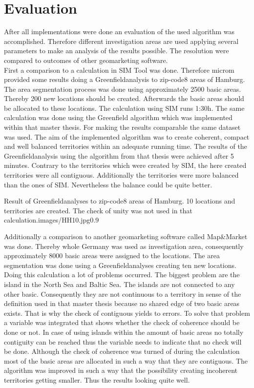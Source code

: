 \section{Evaluation}\label{evaluation}

After all implementations were done an evaluation of the used algorithm was accomplished. Therefore different investigation areas are used applying several parameters to make an analysis of the results possible. The resolution were compared to outcomes of other geomarketing software. \\
First a comparison to a calculation in SIM Tool was done. Therefore microm provided some results doing a Greenfieldanalysis to zip-code8 areas of Hamburg. The area segmentation process was done using approximately 2500 basic areas. Thereby 200 new locations should be created. Afterwards the basic areas should be allocated to these locations. The calculation using SIM runs 1:30h. The same calculation was done using the Greenfield algorithm which was implemented within that master thesis. For making the results comparable the same dataset was used. The aim of the implemented algorithm was to create coherent, compact and well balanced territories within an adequate running time. The results of the Greenfieldanalysis using the algorithm from that thesis were achieved after 5 minutes. Contrary to the territories which were created by SIM, the here created territories were all contiguous. Additionally the territories were more balanced than the ones of SIM. Nevertheless the balance could be quite better.

\begin{figurevarSize}{Result of Greenfieldanalyses to zip-code8 areas of Hamburg. 10 locations and territories are created. The check of unity was not used in that calculation.}{images/HH10.jpg}{0.9}\end{figurevarSize}


Additionally a comparison to another geomarketing software called Map\&Market was done. Thereby whole Germany was used as investigation area, consequently approximately 8000 basic areas were assigned to the locations. The area segmentation was done using a Greenfieldanalyses creating ten new locations. Doing this calculation a lot of problems occurred. The biggest problem are the island in the North Sea and Baltic Sea. The islands are not connected to any other basic. Consequently they are not continuous to a territory in sense of the definition used in that master thesis because no shared edge of two basic areas exists. That is why the check of contiguous yields to errors. To solve that problem a variable was integrated that shows whether the check of coherence should be done or not. In case of using islands within the amount of basic areas no totally contiguity can be reached thus the variable needs to indicate that no check will be done. Although the check of coherence was turned of during the calculation most of the basic areas are allocated in such a way that they are contiguous. The algorithm was improved in such a way that the possibility creating incoherent territories getting smaller. Thus the results looking quite well. 


